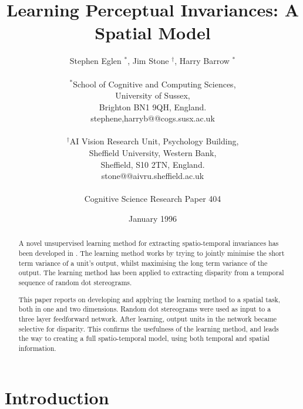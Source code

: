 \documentclass[a4paper]{article}
\newcommand{\sussex}{ {$^\ast$}}
\newcommand{\sheffield}{ {$^\dagger$}}
\begin{document}
\title{Learning Perceptual Invariances: A Spatial Model}

\author{Stephen Eglen\!\sussex, Jim Stone\!\sheffield, Harry
  Barrow\!\sussex\\
\\
\sussex School of Cognitive and Computing Sciences,\\
University of Sussex,\\
Brighton BN1 9QH, England.\\
stephene,harryb@@cogs.susx.ac.uk \\
\\
\sheffield AI Vision Research Unit, Psychology Building,\\
Sheffield University, Western Bank,\\
Sheffield, S10 2TN, England.\\
stone@@aivru.sheffield.ac.uk\\
\\
Cognitive Science Research Paper 404}



\date{January 1996}

\maketitle

\begin{abstract}
  
  A novel unsupervised learning method for extracting spatio-temporal
  invariances has been developed in \cite{stone95b}.  The learning
  method works by trying to jointly minimise the short term variance of a
  unit's output, whilst maximising the long term variance of the output. 
  The learning method has been applied to extracting disparity from a
  temporal sequence of random dot stereograms.

  This paper reports on developing and applying the learning method to
  a spatial task, both in one and two dimensions.  Random dot
  stereograms were used as input to a three layer feedforward network.
  After learning, output units in the network became selective for
  disparity.  This confirms the usefulness of the learning method, and
  leads the way to creating a full spatio-temporal model, using both
  temporal and spatial information.

\end{abstract}

\section{Introduction}
\end{document}
